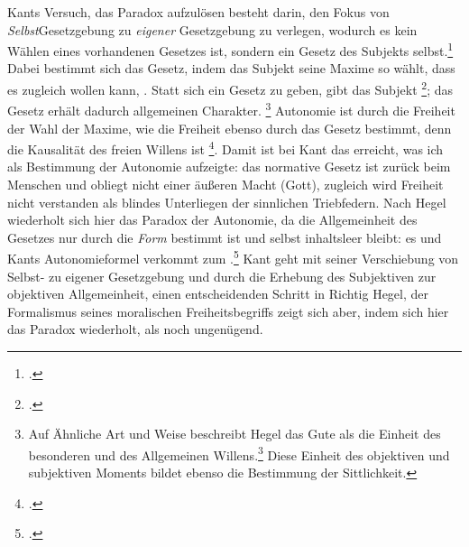 \documentclass[12pt, a4paper, openany]{report}
\begin{document}
Kants Versuch, das Paradox aufzulösen besteht darin, den Fokus von \emph{Selbst}\-Gesetzgebung zu \emph{eigener} Gesetzgebung zu verlegen, wodurch es kein Wählen eines vorhandenen Gesetzes ist, sondern ein Gesetz des Subjekts selbst.\footcite[Vgl.][22]{menke_autonomie_2018}
Dabei bestimmt sich das Gesetz, indem das Subjekt seine Maxime so wählt, dass es zugleich wollen kann, . 
Statt sich ein Gesetz zu geben, gibt das Subjekt \footcite[][24]{menke_autonomie_2018}; das Gesetz erhält dadurch allgemeinen Charakter.%
\footnote{
    \cite[Vgl.][65.]{kant_kritik_2014} 
    Auf Ähnliche Art und Weise beschreibt Hegel das Gute als die Einheit des besonderen und des Allgemeinen Willens.\footcite[Vgl.][§ 129, S. 134.]{hegel_grundlinien_2017}
    Diese Einheit des objektiven und subjektiven Moments bildet ebenso die Bestimmung der Sittlichkeit.
}
Autonomie ist durch die Freiheit der Wahl der Maxime, wie die Freiheit ebenso durch das Gesetz bestimmt, denn die Kausalität des freien Willens ist \footcite[][81]{kant_kritik_2014}.
Damit ist bei Kant das erreicht, was ich als Bestimmung der Autonomie aufzeigte: 
das normative Gesetz ist zurück beim Menschen und obliegt nicht einer äußeren Macht (Gott), zugleich wird Freiheit nicht verstanden als blindes Unterliegen der sinnlichen Triebfedern. 
Nach Hegel wiederholt sich hier das Paradox der Autonomie, da die Allgemeinheit des Gesetzes nur durch die \emph{Form} bestimmt ist und selbst inhaltsleer bleibt:
es  und Kants Autonomieformel verkommt zum .\footcite[][§ 135, S. 139.]{hegel_grundlinien_2017}
Kant geht mit seiner Verschiebung von Selbst- zu eigener Gesetzgebung und durch die Erhebung des Subjektiven zur objektiven Allgemeinheit, einen entscheidenden Schritt in Richtig Hegel, der Formalismus seines moralischen Freiheitsbegriffs zeigt sich aber, indem sich hier das Paradox wiederholt, als noch ungenügend.\\
\end{document}
